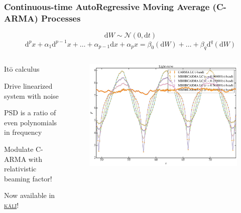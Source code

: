 \documentclass[hyperref={pdfpagelabels=false}]{beamer}
\begin{document}
\begin{frame}
\frametitle{Continuous-time AutoRegressive Moving Average (C-ARMA) Processes}
  \begin{equation*} \mathrm{d}W \sim \mathcal{N}(0,\mathrm{d}t) \end{equation*}
  \begin{equation*}\label{eq:CARMA} \mathrm{d}^{p}x + \alpha_{1} \mathrm{d}^{p-1}x + \ldots + \alpha_{p-1} \mathrm{d}x + \alpha_{p}x = \beta_{0} (\mathrm{d}W) + \ldots + \beta_{q} \mathrm{d}^{q}(\mathrm{d}W) \end{equation*}
  \begin{columns}
    \centering
    \begin{column}{0.5\textwidth}
      \begin{itemize}
        {\scriptsize \item It\={o} calculus {\tiny \citet{Davis,Brockwell14,Kelly14,KasliwalCARMA}}}
        {\scriptsize \item Drive linearized system with noise}
        {\scriptsize \item PSD is a ratio of even polynomials in frequency}
        \item Modulate C-ARMA with relativistic beaming factor!
        \item Now available in \href{https://github.com/AstroVPK/kali}{\textsc{k\={a}l\={i}}}!
      \end{itemize}
    \end{column}
    \begin{column}{0.5\textwidth}
      \begin{figure}
        \includegraphics[scale=0.125]{images/MBHBLCs.jpg}
      \end{figure}
    \end{column}
  \end{columns}
\end{frame}
\end{document}
